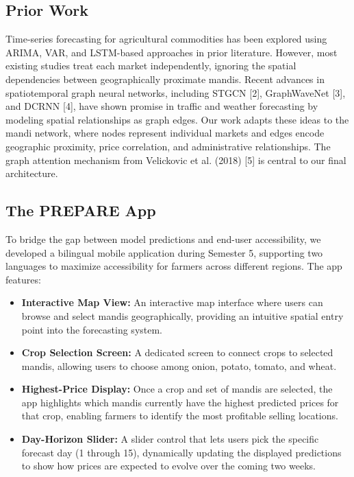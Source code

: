 \documentclass[12pt]{article}
\begin{document}
\subsection{Prior Work}

Time-series forecasting for agricultural commodities has been explored using ARIMA, VAR, and LSTM-based approaches in prior literature. However, most existing studies treat each market independently, ignoring the spatial dependencies between geographically proximate mandis. Recent advances in spatiotemporal graph neural networks, including STGCN [2], GraphWaveNet [3], and DCRNN [4], have shown promise in traffic and weather forecasting by modeling spatial relationships as graph edges. Our work adapts these ideas to the mandi network, where nodes represent individual markets and edges encode geographic proximity, price correlation, and administrative relationships. The graph attention mechanism from Velickovic et al. (2018) [5] is central to our final architecture.

\subsection{The PREPARE App}

To bridge the gap between model predictions and end-user accessibility, we developed a bilingual mobile application during Semester 5, supporting two languages to maximize accessibility for farmers across different regions. The app features:

\begin{itemize}
\item \textbf{Interactive Map View:} An interactive map interface where users can browse and select mandis geographically, providing an intuitive spatial entry point into the forecasting system.
\item \textbf{Crop Selection Screen:} A dedicated screen to connect crops to selected mandis, allowing users to choose among onion, potato, tomato, and wheat.
\item \textbf{Highest-Price Display:} Once a crop and set of mandis are selected, the app highlights which mandis currently have the highest predicted prices for that crop, enabling farmers to identify the most profitable selling locations.
\item \textbf{Day-Horizon Slider:} A slider control that lets users pick the specific forecast day (1 through 15), dynamically updating the displayed predictions to show how prices are expected to evolve over the coming two weeks.
\end{itemize}
\end{document}
